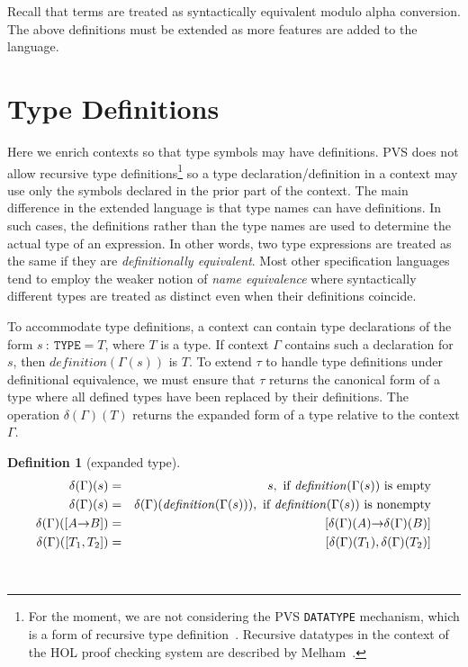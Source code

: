 \documentclass [12pt,twoside]{cslreport}
\newcommand{\thmbox}
   {{\ \hfill\hbox{%
      \vrule width1.0ex height1.0ex
   }\parfillskip 0pt }}
\newcommand{\aro}{\mathord\rightarrow} %
\newcommand{\funtype}[2]{[#1 \aro #2]}
\newcommand{\tupletype}[1]{[#1]}
\newcommand{\listwo}[2]{#1_{1}, #1_{2}}
\newcommand{\itdef}{\textit{definition}}
\newtheorem{definition}{Definition}
\newenvironment{Defn}[1]{\begin{definition}[#1]\label{defn:#1}}{
\thmbox\end{definition}}
\begin{document}
Recall that terms are treated as syntactically equivalent modulo
alpha conversion.  
The above definitions must be extended as more 
features are added to the language. 

\section{Type Definitions}


Here we enrich contexts so that type symbols may have definitions.  PVS
does not allow recursive type definitions\footnote{For the moment, we are
not considering the PVS \texttt{DATATYPE} mechanism, which is a form of
recursive type definition~\cite{Shankar:ADT}.  Recursive datatypes in
the context of the HOL proof checking system are described by
Melham~\cite{Melham89}.}  so a type declaration/definition in a context
may use only the symbols declared in the prior part of the context.  The
main difference in the extended language is that type names can have
definitions.  In such cases, the definitions rather than the type names
are used to determine the actual type of an expression.  In other words,
two type expressions are treated as the same if they are
\emph{definitionally equivalent}\@.  Most other specification languages
tend to employ the weaker notion of \emph{name equivalence} where
syntactically different types are treated as distinct even when their
definitions coincide.

To accommodate type definitions, a context can
contain type declarations of the form $s\ :\ \mathtt{TYPE} = T$, where $T$
is a type.  If context $\Gamma$ contains such a declaration for $s$, then
$ \itdef{}(\Gamma(s))$ is $T$\@.  To extend $\tau$ to handle type
definitions under definitional equivalence, we must ensure that $\tau$
returns the canonical form of a type where all defined types have been
replaced by their definitions.  The operation $\delta(\Gamma)(T)$ returns
the expanded form of a type relative to the context $\Gamma$\@.
%
\begin{Defn}{expanded type}
\begin{eqnarray*}
  \delta(\Gamma)(s) & = & s, \mbox{ if } \textit{definition\/}(\Gamma(s))
\mbox{ is empty}\\
% 
  \delta(\Gamma)(s) & = & \delta(\Gamma)(
\textit{definition\/}(\Gamma(s))), 
\mbox{ if } \textit{definition\/}(\Gamma(s))
\mbox{ is nonempty} \\
%
 \delta(\Gamma)(\funtype{A}{B}) & = &
      \funtype{\delta(\Gamma)(A)}{\delta(\Gamma)(B)} \\
%
 \delta(\Gamma)(\tupletype{\listwo{T}{n}}) & = &
     \tupletype{\delta(\Gamma)(T_1),  \delta(\Gamma)(T_2)}
\end{eqnarray*}
\end{Defn}
\end{document}

